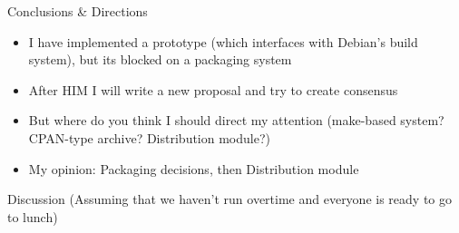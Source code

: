 \documentclass[pdf,rico,slideColor,colorBG]{prosper}
\begin{document}
\begin{slide}{Conclusions \& Directions}
  \begin{itemize}
  \item I have implemented a prototype (which interfaces with Debian's
  build system), but its blocked on a packaging system
  \item After HIM I will write a new proposal and try to create consensus
   \item But where do you think I should direct my attention (make-based system? CPAN-type archive? Distribution module?)
   \item My opinion: Packaging decisions, then Distribution module
  \end{itemize}
\end{slide}

\begin{slide}{Discussion}
(Assuming that we haven't run overtime and everyone is ready to go to lunch)
\end{slide}






\end{document}
